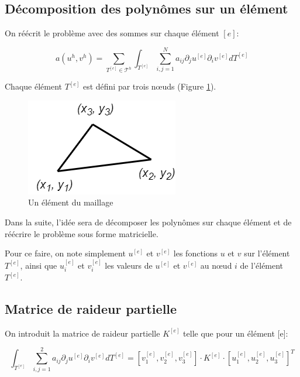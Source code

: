 \documentclass{article}
\begin{document}
\subsection{Décomposition des polynômes sur un élément}

On réécrit le problème avec des sommes sur chaque élément $[e]$:

\begin{equation}
    a(u^h, v^h) = \sum_{T^{[e]} \in \mathcal{T}^h} \int_{T^{[e]}}
    \sum_{i,j=1}^N a_{ij} \partial_j u ^{[e]} \partial_i v^{[e]} dT^{[e]}
    \label{eq:general_problem}
\end{equation}

Chaque élément $T^{[e]}$ est défini par trois
nœuds (Figure \ref{fig:element}).

\begin{figure}[h]
    \centering
    \includegraphics[scale=0.5]{img/element.png}
    \caption{Un élément du maillage}
    \label{fig:element}
\end{figure}

Dans la suite, l'idée sera de décomposer les polynômes
sur chaque élément et de réécrire le problème sous forme
matricielle.

Pour ce faire, on note simplement $u^{[e]}$ et $v^{[e]}$
les fonctions $u$ et $v$ sur l'élément $T^{[e]}$, ainsi que
$u^{[e]}_i$ et $v^{[e]}_i$ les valeurs de $u^{[e]}$ et $v^{[e]}$
au nœud $i$ de l'élément $T^{[e]}$.

\subsection{Matrice de raideur partielle}

On introduit la matrice de raideur partielle
$K^{[e]}$ telle que pour un élément [e]:

\begin{equation}
    \int_{T^{[e]}} \sum_{i,j=1}^2 a_{ij} \partial_j u ^{[e]}
     \partial_i v^{[e]} dT^{[e]} 
     = \left[ v_1^{[e]}, v_2^{[e]},  v_3^{[e]} \right] \cdot K^{[e]}
     \cdot \left[ u_1^{[e]}, u_2^{[e]}, u_3^{[e]} \right]^T
    \label{eq:int_to_K}
\end{equation}
\end{document}
